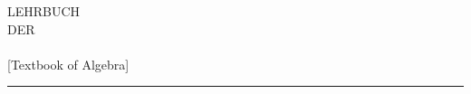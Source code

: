 \begin{center}
\vspace*{5cm}
{\Large LEHRBUCH}\\[1cm]
{\small DER}\\[1.2cm]
{\Huge {}}\\[0.8cm]
{\large [Textbook of Algebra]}\\[1.2cm]
\rule{3cm}{0.4pt}
\end{center}
